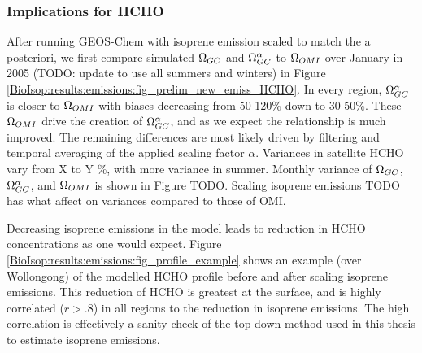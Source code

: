     
    

    \subsubsection{Implications for HCHO}
  
      After running GEOS-Chem with isoprene emission scaled to match the a posteriori, we first compare simulated $\Omega_{GC}$ and $\Omega_{GC}^{\alpha}$ to $\Omega_{OMI}$ over January in 2005 (TODO: update to use all summers and winters) in Figure \ref{BioIsop:results:emissions:fig_prelim_new_emiss_HCHO}.
      In every region, $\Omega_{GC}^{\alpha}$ is closer to $\Omega_{OMI}$ with biases decreasing from 50-120\% down to 30-50\%.
      These $\Omega_{OMI}$ drive the creation of $\Omega_{GC}^{\alpha}$, and as we expect the relationship is much improved.
      The remaining differences are most likely driven by filtering and temporal averaging of the applied scaling factor $\alpha$.
      Variances in satellite HCHO vary from X to Y \%, with more variance in summer.
      Monthly variance of $\Omega_{GC}$, $\Omega_{GC}^{\alpha}$, and $\Omega_{OMI}$ is shown in Figure TODO.
      Scaling isoprene emissions TODO has what affect on variances compared to those of OMI.
      
      
      Decreasing isoprene emissions in the model leads to reduction in HCHO concentrations as one would expect.
      Figure \ref{BioIsop:results:emissions:fig_profile_example} shows an example (over Wollongong) of the modelled HCHO profile before and after scaling isoprene emissions.
      This reduction of HCHO is greatest at the surface, and is highly correlated ($r>.8$) in all regions to the reduction in isoprene emissions.
      The high correlation is effectively a sanity check of the top-down method used in this thesis to estimate isoprene emissions.
      
  
